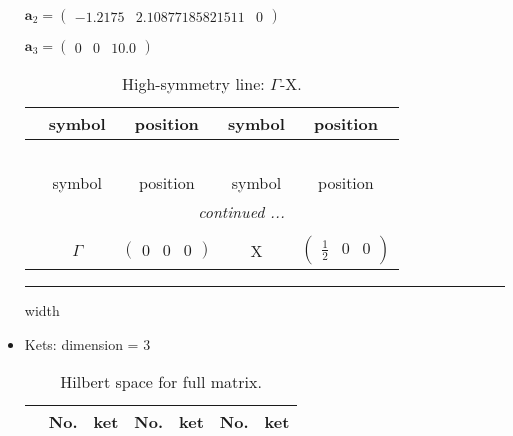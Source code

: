 \documentclass[fleqn,10pt,landscape]{article}
\begin{document}
\begin{itemize}
\quad $\bm{a}_2=\begin{pmatrix} -1.2175 & 2.10877185821511 & 0 \end{pmatrix}$

\quad $\bm{a}_3=\begin{pmatrix} 0 & 0 & 10.0 \end{pmatrix}$

\begin{center}
\renewcommand{\arraystretch}{1.3}
\begin{longtable}{c|cc|cc}
\caption{High-symmetry line: $\Gamma$-X.}
 \\
 \hline \hline
 & symbol & position & symbol & position \\ \hline \endfirsthead

\multicolumn{4}{l}{\tablename\ \thetable{}} \\
 \hline \hline
 & symbol & position & symbol & position \\ \hline \endhead

 \hline \hline
\multicolumn{4}{r}{\footnotesize\it continued ...} \\ \endfoot

 \hline \hline
\multicolumn{4}{r}{} \\ \endlastfoot

 & $\Gamma$ & $\begin{pmatrix} 0 & 0 & 0 \end{pmatrix}$ & X & $\begin{pmatrix} \frac{1}{2} & 0 & 0 \end{pmatrix}$ \\
\end{longtable}
\end{center}

 \hfil \hrule height 1mm width \textwidth \hfil

\item Kets: dimension = 3
\begin{center}
\renewcommand{\arraystretch}{1.3}
\begin{longtable}{c|cc|cc|cc}
\caption{Hilbert space for full matrix.}
 \\
 \hline \hline
 & No. & ket & No. & ket & No. & ket \\ \hline \endfirsthead


\end{longtable}
\end{center}
\end{itemize}
\end{document}
